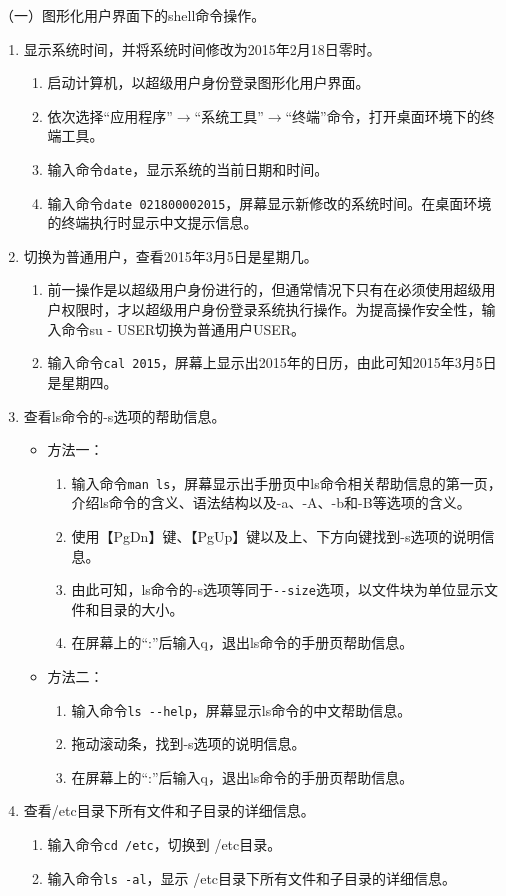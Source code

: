\vspace{0.1in}
（一）图形化用户界面下的shell命令操作。
\begin{enumerate}
  \item 显示系统时间，并将系统时间修改为2015年2月18日零时。
    \begin{enumerate}
      \item 启动计算机，以超级用户身份登录图形化用户界面。
      \item 依次选择“应用程序”$\rightarrow$“系统工具”$\rightarrow$“终端”命令，打开桌面环境下的终端工具。
      \item 输入命令\verb|date|，显示系统的当前日期和时间。
      \item 输入命令\verb|date 021800002015|，屏幕显示新修改的系统时间。在桌面环境的终端执行时显示中文提示信息。
    \end{enumerate}
  \item 切换为普通用户，查看2015年3月5日是星期几。
    \begin{enumerate}
      \item 前一操作是以超级用户身份进行的，但通常情况下只有在必须使用超级用户权限时，才以超级用户身份登录系统执行操作。为提高操作安全性，输入命令su - USER切换为普通用户USER。
      \item 输入命令\verb|cal 2015|，屏幕上显示出2015年的日历，由此可知2015年3月5日是星期四。
    \end{enumerate}
  \item 查看ls命令的-s选项的帮助信息。
    \begin{itemize}
      \item 方法一：
	\begin{enumerate}
	  \item 输入命令\verb|man ls|，屏幕显示出手册页中ls命令相关帮助信息的第一页，介绍ls命令的含义、语法结构以及-a、-A、-b和-B等选项的含义。
	  \item 使用【PgDn】键、【PgUp】键以及上、下方向键找到-s选项的说明信息。
	  \item 由此可知，ls命令的-s选项等同于\verb|--size|选项，以文件块为单位显示文件和目录的大小。
	  \item 在屏幕上的“:”后输入q，退出ls命令的手册页帮助信息。
	\end{enumerate}
      \item 方法二：
	\begin{enumerate}
	  \item 输入命令\verb|ls --help|，屏幕显示ls命令的中文帮助信息。
	  \item 拖动滚动条，找到-s选项的说明信息。
	  \item 在屏幕上的“:”后输入q，退出ls命令的手册页帮助信息。
	\end{enumerate}
    \end{itemize}
  \item 查看/etc目录下所有文件和子目录的详细信息。
    \begin{enumerate}
      \item 输入命令\verb|cd /etc|，切换到 /etc目录。
      \item 输入命令\verb|ls -al|，显示 /etc目录下所有文件和子目录的详细信息。
    \end{enumerate}
\end{enumerate}

